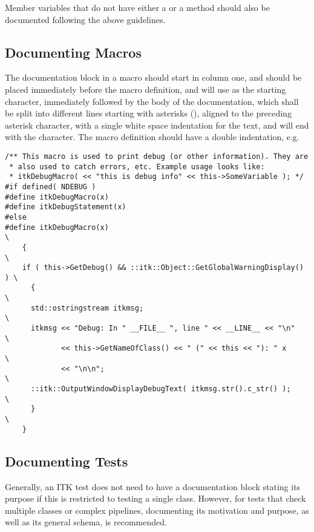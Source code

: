 Member variables that do not have either a  or a
 method should also be documented following the above
guidelines.


\subsection{Documenting Macros}
\label{subsec:DocumentingMacros}

The documentation block in a macro should start in column one, and should be
placed immediately before the macro definition, and will use \code{/*} as the
starting character, immediately followed by the body of the documentation, which
shall be split into different lines starting with asterisks (\code{*}), aligned
to the preceding asterisk character, with a single white space indentation for
the text, and will end with the \code{*/} character. The macro definition
should have a double indentation, e.g.

\small
\begin{verbatim}
/** This macro is used to print debug (or other information). They are
 * also used to catch errors, etc. Example usage looks like:
 * itkDebugMacro( << "this is debug info" << this->SomeVariable ); */
#if defined( NDEBUG )
#define itkDebugMacro(x)
#define itkDebugStatement(x)
#else
#define itkDebugMacro(x)                                                \
    {                                                                   \
    if ( this->GetDebug() && ::itk::Object::GetGlobalWarningDisplay() ) \
      {                                                                 \
      std::ostringstream itkmsg;                                        \
      itkmsg << "Debug: In " __FILE__ ", line " << __LINE__ << "\n"     \
             << this->GetNameOfClass() << " (" << this << "): " x       \
             << "\n\n";                                                 \
      ::itk::OutputWindowDisplayDebugText( itkmsg.str().c_str() );      \
      }                                                                 \
    }
\end{verbatim}
\normalsize


\subsection{Documenting Tests}
\label{subsec:DocumentingTests}

Generally, an ITK test does not need to have a documentation block stating its
purpose if this is restricted to testing a single class. However, for tests that
check multiple classes or complex pipelines, documenting its motivation and
purpose, as well as its general schema, is recommended.


